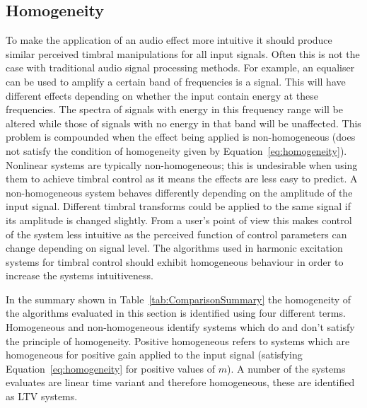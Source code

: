 	\subsection{Homogeneity}
	\label{sec:ExcitationEvaluation-Evaluation-Homogeneity}
		To make the application of an audio effect more intuitive it should produce similar perceived timbral
		manipulations for all input signals. Often this is not the case with traditional audio signal processing
		methods. For example, an equaliser can be used to amplify a certain band of frequencies is a signal. This
		will have different effects depending on whether the input contain energy at these frequencies. The spectra
		of signals with energy in this frequency range will be altered while those of signals with no energy in
		that band will be unaffected. This problem is compounded when the effect being applied is non-homogeneous
		(does not satisfy the condition of homogeneity given by Equation~\ref{eq:homogeneity}).  Nonlinear systems
		are typically non-homogeneous; this is undesirable when using them to achieve timbral control as it means
		the effects are less easy to predict. A non-homogeneous system behaves differently depending on the
		amplitude of the input signal. Different timbral transforms could be applied to the same signal if its
		amplitude is changed slightly. From a user's point of view this makes control of the system less intuitive
		as the perceived function of control parameters can change depending on signal level. The algorithms used
		in harmonic excitation systems for timbral control should exhibit homogeneous behaviour in order to
		increase the systems intuitiveness.

		In the summary shown in Table~\ref{tab:ComparisonSummary} the homogeneity of the algorithms evaluated in
		this section is identified using four different terms. Homogeneous and non-homogeneous identify systems
		which do and don't satisfy the principle of homogeneity. Positive homogeneous refers to systems which are
		homogeneous for positive gain applied to the input signal (satisfying Equation~\ref{eq:homogeneity} for
		positive values of $m$). A number of the systems evaluates are linear time variant and therefore
		homogeneous, these are identified as LTV systems.

